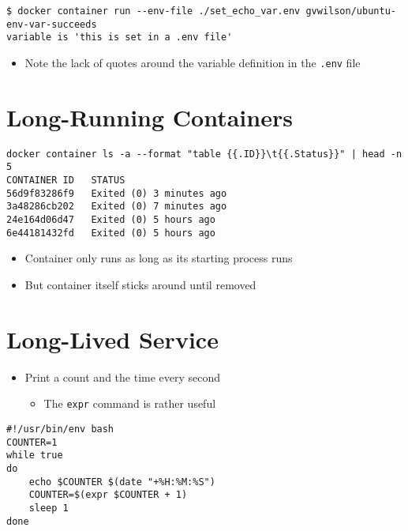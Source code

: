 \documentclass[krantzl]{krantz}
\begin{document}
\begin{lstlisting}[frame=tblr,backgroundcolor=\color{black!5}]
$ docker container run --env-file ./set_echo_var.env gvwilson/ubuntu-env-var-succeeds
variable is 'this is set in a .env file'
\end{lstlisting}

\begin{itemize}
\item Note the lack of quotes around the variable definition in the \texttt{.env} file

\end{itemize}
\section{Long-Running Containers}
\begin{lstlisting}[frame=tblr,backgroundcolor=\color{black!5}]
docker container ls -a --format "table {{.ID}}\t{{.Status}}" | head -n 5
CONTAINER ID   STATUS
56d9f83286f9   Exited (0) 3 minutes ago
3a48286cb202   Exited (0) 7 minutes ago
24e164d06d47   Exited (0) 5 hours ago
6e44181432fd   Exited (0) 5 hours ago
\end{lstlisting}

\begin{itemize}
\item Container only runs as long as its starting process runs

\item But container itself sticks around until removed

\end{itemize}
\section{Long-Lived Service}
\begin{itemize}
\item Print a count and the time every second\begin{itemize}
\item The \texttt{expr} command is rather useful

\end{itemize}


\end{itemize}
\begin{lstlisting}[frame=tblr]
#!/usr/bin/env bash
COUNTER=1
while true
do
    echo $COUNTER $(date "+%H:%M:%S")
    COUNTER=$(expr $COUNTER + 1)
    sleep 1
done
\end{lstlisting}
\end{document}
